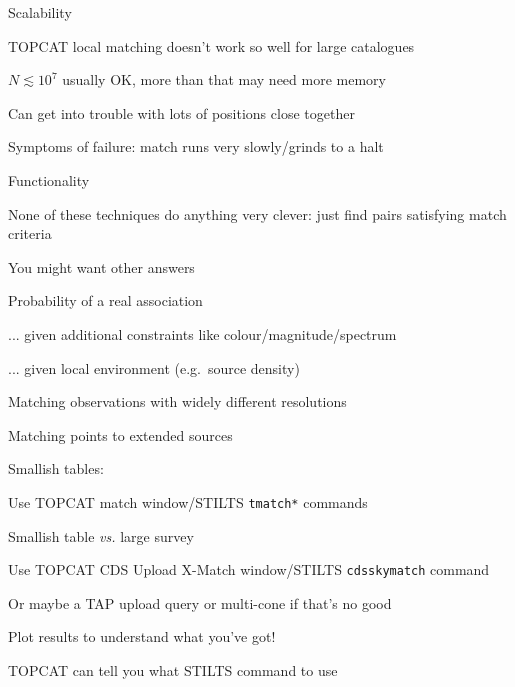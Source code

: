 \documentclass[20pt,landscape]{foils}
\begin{document}

\begin{list0}
  \item Scalability
  \begin{list2}
    \item TOPCAT local matching doesn't work so well for large catalogues
    \begin{list3}
      \item $N \lesssim 10^{7}$ usually OK, more than that may need more memory
    \end{list3}
    \item Can get into trouble with lots of positions close together
    \item Symptoms of failure: match runs very slowly/grinds to a halt
  \end{list2}
  \item Functionality
  \begin{list2}
    \item None of these techniques do anything very clever:
          just find pairs satisfying match criteria
    \item You might want other answers
    \begin{list3}
      \item Probability of a real association
      \item ... given additional constraints like colour/magnitude/spectrum
      \item ... given local environment (e.g.\ source density)
      \item Matching observations with widely different resolutions
      \item Matching points to extended sources
    \end{list3}
  \end{list2}
\end{list0}


\begin{list0}
  \item Smallish tables:
  \begin{list2big}
    \item Use TOPCAT match window/STILTS {\color{brown}\tt tmatch*} commands
  \end{list2big}
  \item Smallish table {\sl vs.\/} large survey
  \begin{list2big}
    \item Use TOPCAT CDS Upload X-Match window/STILTS {\color{brown}\tt cdsskymatch} command
    \item Or maybe a TAP upload query or multi-cone if that's no good
  \end{list2big}
  \item Plot results to understand what you've got!
  \item TOPCAT can tell you what STILTS command to use
\end{list0}

\label{lastPage}

\newpage
\rightfooter{}
\MyLogo{}
\end{document}
